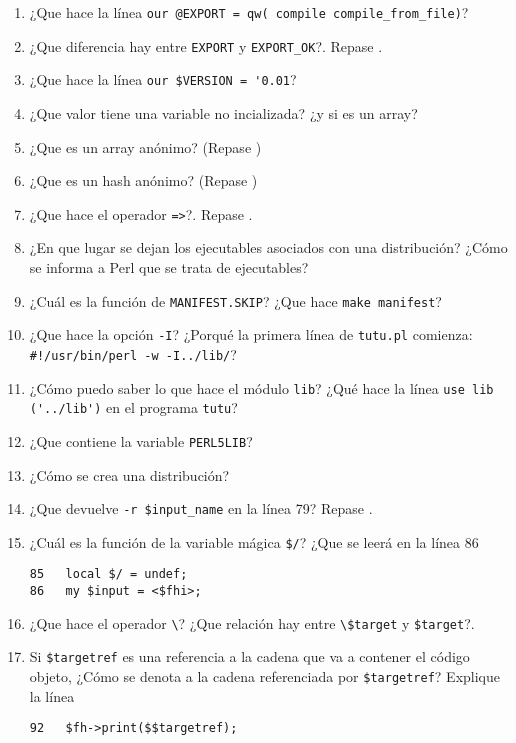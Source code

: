 \begin{enumerate}
\item
¿Que hace la línea
\verb|our @EXPORT = qw( compile compile_from_file)|?
\item
¿Que diferencia hay entre \verb|EXPORT| y \verb|EXPORT_OK|?.
Repase .
\item
¿Que hace la línea
\verb|our $VERSION = '0.01|?
\item
¿Que valor tiene una variable no incializada? ¿y si es un array?
\item
¿Que es un array anónimo? 
(Repase )
\item
¿Que es un hash anónimo?
(Repase )
\item
¿Que hace el operador \verb|=>|?.
Repase 
.
\item
¿En que lugar se dejan los ejecutables asociados con una distribución?
¿Cómo se informa a Perl que se trata de ejecutables?
\item
¿Cuál es la función de \verb|MANIFEST.SKIP|?
¿Que hace \verb|make manifest|?
\item
¿Que hace la opción \verb|-I|?
¿Porqué la primera línea de \verb|tutu.pl| comienza:\\
\verb|#!/usr/bin/perl -w -I../lib/|?
\item
¿Cómo puedo saber lo que hace el módulo \verb|lib|?
¿Qué hace la línea \verb|use lib ('../lib')| en el programa \verb|tutu|?
\item
¿Que contiene la variable \verb|PERL5LIB|?
\item
¿Cómo se crea una distribución?
\item
¿Que devuelve \verb|-r $input_name| en la línea 79?
Repase 
.
\item
¿Cuál es la función de la variable mágica \verb|$/|?
¿Que se leerá en la línea 86
\begin{verbatim}
85   local $/ = undef;
86   my $input = <$fhi>;
\end{verbatim}
\item
¿Que hace el operador \verb|\|? ¿Que relación hay entre \verb|\$target| y \verb|$target|?.
\item
Si \verb|$targetref| es una referencia a la cadena que va a contener el
código objeto, ¿Cómo se denota a la cadena referenciada por \verb|$targetref|?
Explique la línea 
\begin{verbatim}
92   $fh->print($$targetref);
\end{verbatim}
\end{enumerate}

